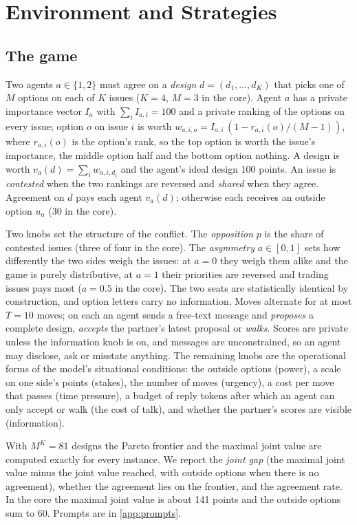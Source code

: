 \section{Environment and Strategies}
\label{sec:env}

\subsection{The game}
\label{sec:game}
Two agents $a \in \{1,2\}$ must agree on a \emph{design} $d = (d_1,\dots,d_K)$ that picks one of $M$ options on each of $K$ issues ($K=4$, $M=3$ in the core). Agent $a$ has a private importance vector $I_a$ with $\sum_i I_{a,i} = 100$ and a private ranking of the options on every issue; option $o$ on issue $i$ is worth $w_{a,i,o} = I_{a,i}\,(1 - r_{a,i}(o)/(M-1))$, where $r_{a,i}(o)$ is the option's rank, so the top option is worth the issue's importance, the middle option half and the bottom option nothing. A design is worth $v_a(d) = \sum_i w_{a,i,d_i}$ and the agent's ideal design 100 points. An issue is \emph{contested} when the two rankings are reversed and \emph{shared} when they agree. Agreement on $d$ pays each agent $v_a(d)$; otherwise each receives an outside option $u_a$ (30 in the core).

Two knobs set the structure of the conflict. The \emph{opposition} $p$ is the share of contested issues (three of four in the core). The \emph{asymmetry} $a \in [0,1]$ sets how differently the two sides weigh the issues: at $a=0$ they weigh them alike and the game is purely distributive, at $a=1$ their priorities are reversed and trading issues pays most ($a=0.5$ in the core). The two seats are statistically identical by construction, and option letters carry no information. Moves alternate for at most $T=10$ moves; on each an agent sends a free-text message and \emph{proposes} a complete design, \emph{accepts} the partner's latest proposal or \emph{walks}. Scores are private unless the information knob is on, and messages are unconstrained, so an agent may disclose, ask or misstate anything. The remaining knobs are the operational forms of the \tki{} model's situational conditions: the outside options (power), a scale on one side's points (stakes), the number of moves (urgency), a cost per move that passes (time pressure), a budget of reply tokens after which an agent can only accept or walk (the cost of talk), and whether the partner's scores are visible (information).

With $M^K = 81$ designs the Pareto frontier and the maximal joint value are computed exactly for every instance. We report the \emph{joint gap} (the maximal joint value minus the joint value reached, with outside options when there is no agreement), whether the agreement lies on the frontier, and the agreement rate. In the core the maximal joint value is about 141 points and the outside options sum to 60. Prompts are in \cref{app:prompts}.

